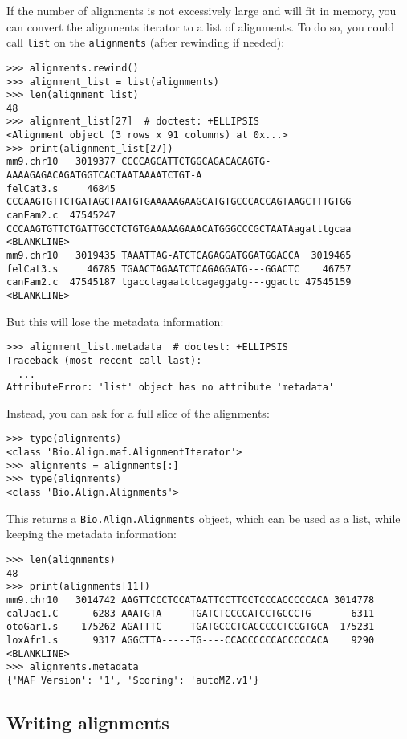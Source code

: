 If the number of alignments is not excessively large and will fit in memory, you can convert the alignments iterator to a list of alignments. To do so, you could call \verb|list| on the \verb|alignments| (after rewinding if needed):
\begin{verbatim}
>>> alignments.rewind()
>>> alignment_list = list(alignments)
>>> len(alignment_list)
48
>>> alignment_list[27]  # doctest: +ELLIPSIS
<Alignment object (3 rows x 91 columns) at 0x...>
>>> print(alignment_list[27])
mm9.chr10   3019377 CCCCAGCATTCTGGCAGACACAGTG-AAAAGAGACAGATGGTCACTAATAAAATCTGT-A
felCat3.s     46845 CCCAAGTGTTCTGATAGCTAATGTGAAAAAGAAGCATGTGCCCACCAGTAAGCTTTGTGG
canFam2.c  47545247 CCCAAGTGTTCTGATTGCCTCTGTGAAAAAGAAACATGGGCCCGCTAATAagatttgcaa
<BLANKLINE>
mm9.chr10   3019435 TAAATTAG-ATCTCAGAGGATGGATGGACCA  3019465
felCat3.s     46785 TGAACTAGAATCTCAGAGGATG---GGACTC    46757
canFam2.c  47545187 tgacctagaatctcagaggatg---ggactc 47545159
<BLANKLINE>
\end{verbatim}
But this will lose the metadata information:
\begin{verbatim}
>>> alignment_list.metadata  # doctest: +ELLIPSIS
Traceback (most recent call last):
  ...
AttributeError: 'list' object has no attribute 'metadata'
\end{verbatim}
Instead, you can ask for a full slice of the alignments:
\begin{verbatim}
>>> type(alignments)
<class 'Bio.Align.maf.AlignmentIterator'>
>>> alignments = alignments[:]
>>> type(alignments)
<class 'Bio.Align.Alignments'>
\end{verbatim}
This returns a \verb|Bio.Align.Alignments| object, which can be used as a list, while keeping the metadata information:
\begin{verbatim}
>>> len(alignments)
48
>>> print(alignments[11])
mm9.chr10   3014742 AAGTTCCCTCCATAATTCCTTCCTCCCACCCCCACA 3014778
calJac1.C      6283 AAATGTA-----TGATCTCCCCATCCTGCCCTG---    6311
otoGar1.s    175262 AGATTTC-----TGATGCCCTCACCCCCTCCGTGCA  175231
loxAfr1.s      9317 AGGCTTA-----TG----CCACCCCCCACCCCCACA    9290
<BLANKLINE>
>>> alignments.metadata
{'MAF Version': '1', 'Scoring': 'autoMZ.v1'}
\end{verbatim}

\subsection{Writing alignments}
\label{subsec:align_writing}

